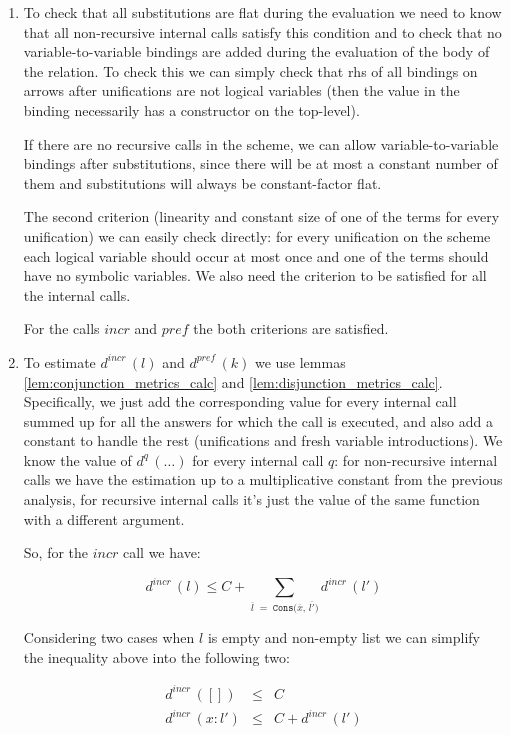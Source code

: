 \begin{enumerate}
\item To check that all substitutions are flat during the evaluation we need to know that all non-recursive internal calls satisfy this condition and to check that no variable-to-variable bindings are added during the evaluation of the body of the relation. To check this we can simply check that rhs of all bindings on arrows after unifications are not logical variables (then the value in the binding
necessarily has a constructor on the top-level).

If there are no recursive calls in the scheme, we can allow variable-to-variable bindings after substitutions, since there will be at most a constant number of them and substitutions will always be constant-factor flat.

The second criterion (linearity and constant size of one of the terms for every unification) we can easily check directly: for every unification on the scheme each logical variable should occur at most once and one of the terms should have no symbolic variables. We also need the criterion to be satisfied for all the internal calls.

For the calls $incr$ and $pref$ the both criterions are satisfied.

\item To estimate $d^{incr}\,(l)$ and $d^{pref}\,(k)$ we use lemmas \ref{lem:conjunction_metrics_calc} and \ref{lem:disjunction_metrics_calc}. Specifically, we just add the corresponding value for every internal call summed up for all the answers for which the call is executed, and also add a constant to handle the rest (unifications and fresh variable introductions). We know the value of $d^q\,(\dots)$ for every internal call $q$: for non-recursive internal calls we have the estimation up to a multiplicative constant from the previous analysis, for recursive internal calls it's just the value of the same function with a different argument.
  
So, for the $incr$ call we have:

\[ d^{incr}\,(l) \le C + \sum_{\overline{l} \;=\; \texttt{Cons($\overline{x}$, $\overline{l'}$)}} d^{incr}\,(l') \]

Considering two cases when $l$ is empty and non-empty list we can simplify the inequality above into the following two:

\[
\begin{array}{lcl}
d^{incr}\,([]) &\le& C \\
d^{incr}\,(x : l') &\le& C + d^{incr}\,(l')
\end{array} \]


\end{enumerate}
